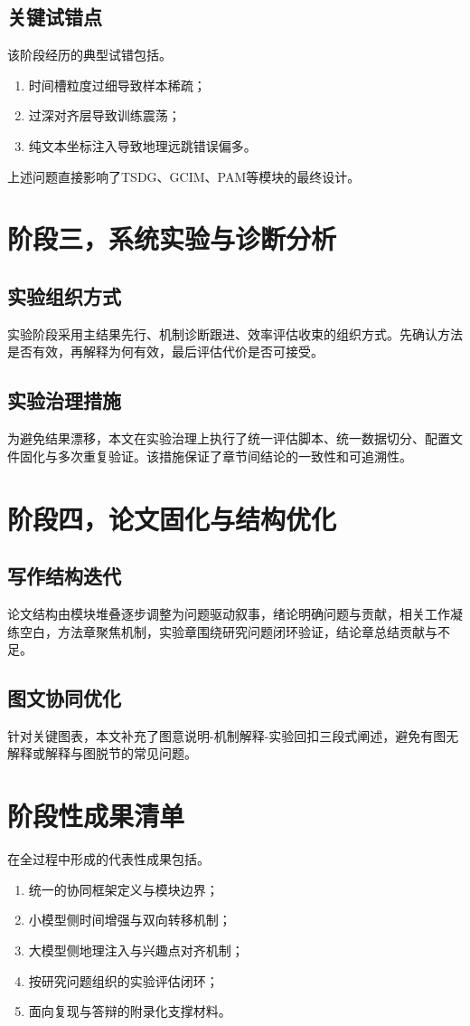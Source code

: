 \subsection{关键试错点}
该阶段经历的典型试错包括。
\begin{enumerate}
    \item 时间槽粒度过细导致样本稀疏；
    \item 过深对齐层导致训练震荡；
    \item 纯文本坐标注入导致地理远跳错误偏多。
\end{enumerate}
\par\indent 上述问题直接影响了TSDG、GCIM、PAM等模块的最终设计。

\section{阶段三，系统实验与诊断分析}
\subsection{实验组织方式}
实验阶段采用主结果先行、机制诊断跟进、效率评估收束的组织方式。先确认方法是否有效，再解释为何有效，最后评估代价是否可接受。

\subsection{实验治理措施}
为避免结果漂移，本文在实验治理上执行了统一评估脚本、统一数据切分、配置文件固化与多次重复验证。该措施保证了章节间结论的一致性和可追溯性。

\section{阶段四，论文固化与结构优化}
\subsection{写作结构迭代}
论文结构由模块堆叠逐步调整为问题驱动叙事，绪论明确问题与贡献，相关工作凝练空白，方法章聚焦机制，实验章围绕研究问题闭环验证，结论章总结贡献与不足。

\subsection{图文协同优化}
针对关键图表，本文补充了图意说明-机制解释-实验回扣三段式阐述，避免有图无解释或解释与图脱节的常见问题。

\section{阶段性成果清单}
在全过程中形成的代表性成果包括。
\begin{enumerate}
    \item 统一的协同框架定义与模块边界；
    \item 小模型侧时间增强与双向转移机制；
    \item 大模型侧地理注入与兴趣点对齐机制；
    \item 按研究问题组织的实验评估闭环；
    \item 面向复现与答辩的附录化支撑材料。
\end{enumerate}

